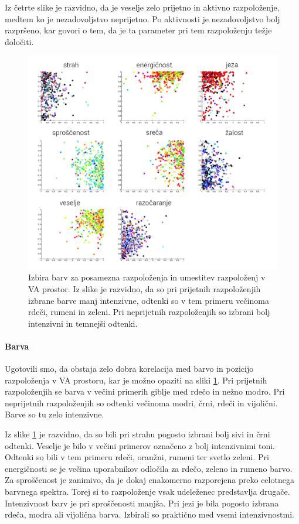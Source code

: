 \documentclass[a4paper, 12pt]{book}
\begin{document}
{Iz četrte slike je razvidno, da je veselje zelo prijetno in aktivno razpoloženje, medtem ko je nezadovoljstvo neprijetno. Po aktivnosti je nezadovoljstvo bolj razpršeno, kar govori o tem, da je ta parameter pri tem razpoloženju težje določiti.

\begin{figure}[!hbt]
\centering
\includegraphics[width=14cm]{images/mood_color.png}

\caption{Izbira barv za posamezna razpoloženja in umestitev razpoloženj v VA prostor. Iz slike je razvidno, da so pri prijetnih razpoloženjih izbrane barve manj intenzivne, odtenki so v tem primeru večinoma rdeči, rumeni in zeleni. Pri neprijetnih razpoloženjih so izbrani bolj intenzivni in temnejši odtenki.}
\label{moodcolor}
\end{figure} 

\paragraph{Barva}

Ugotovili smo, da obstaja zelo dobra korelacija med barvo in  pozicijo razpoloženja v VA prostoru, kar je možno opaziti na sliki \ref{moodcolor}. Pri prijetnih razpoloženjih se barva v večini primerih giblje med rdečo in nežno modro. Pri neprijetnih razpoloženjih so odtenki večinoma modri, črni, rdeči in vijolični. Barve so tu zelo intenzivne.

Iz slike \ref{moodcolor} je razvidno, da so bili pri strahu pogosto izbrani bolj sivi in črni odtenki. Veselje je bilo v večini primerov označeno z bolj intenzivnimi toni. Odtenki so bili v tem primeru rdeči, oranžni, rumeni ter svetlo zeleni. Pri energičnosti se je večina uporabnikov odločila za rdečo, zeleno in rumeno barvo. Za sproščenost je zanimivo, da je dokaj enakomerno razporejena preko celotnega barvnega spektra. Torej si to razpoloženje vsak udeleženec predstavlja drugače. Intenzivnost barv je pri sproščenosti manjša. Pri jezi je bila pogosto izbrana rdeča, modra ali vijolična barva. Izbirali so praktično med vsemi intenzivnostmi.


}
\end{document}
